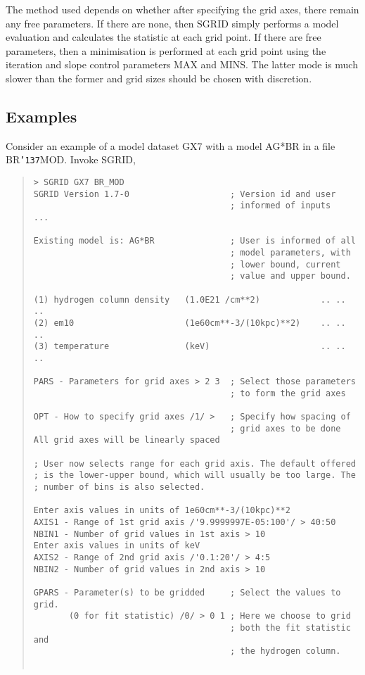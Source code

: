 \documentclass{book}
\renewcommand{\_}{{\tt\char'137}}     %
\begin{document}
The method used depends on whether after specifying the grid
axes, there remain any free parameters. If there are none, then
SGRID simply performs a model evaluation and calculates the
statistic at each grid point. If there are free parameters,
then a minimisation is performed at each grid point using the
iteration and slope control parameters MAX and MINS. The latter
mode is much slower than the former and grid sizes should be
chosen with discretion.

\subsection{Examples}
Consider an example of a model dataset GX7 with a model AG*BR
in a file BR\_MOD. Invoke SGRID,
\begin{quote}\begin{verbatim}
> SGRID GX7 BR_MOD
SGRID Version 1.7-0                    ; Version id and user
                                       ; informed of inputs
...

Existing model is: AG*BR               ; User is informed of all
                                       ; model parameters, with
                                       ; lower bound, current
                                       ; value and upper bound.

(1) hydrogen column density   (1.0E21 /cm**2)            .. .. ..
(2) em10                      (1e60cm**-3/(10kpc)**2)    .. .. ..
(3) temperature               (keV)                      .. .. ..

PARS - Parameters for grid axes > 2 3  ; Select those parameters
                                       ; to form the grid axes

OPT - How to specify grid axes /1/ >   ; Specify how spacing of
                                       ; grid axes to be done
All grid axes will be linearly spaced

; User now selects range for each grid axis. The default offered
; is the lower-upper bound, which will usually be too large. The
; number of bins is also selected.

Enter axis values in units of 1e60cm**-3/(10kpc)**2
AXIS1 - Range of 1st grid axis /'9.9999997E-05:100'/ > 40:50
NBIN1 - Number of grid values in 1st axis > 10
Enter axis values in units of keV
AXIS2 - Range of 2nd grid axis /'0.1:20'/ > 4:5
NBIN2 - Number of grid values in 2nd axis > 10

GPARS - Parameter(s) to be gridded     ; Select the values to grid.
       (0 for fit statistic) /0/ > 0 1 ; Here we choose to grid
                                       ; both the fit statistic and
                                       ; the hydrogen column.


\end{verbatim}
\end{quote}
\end{document}
